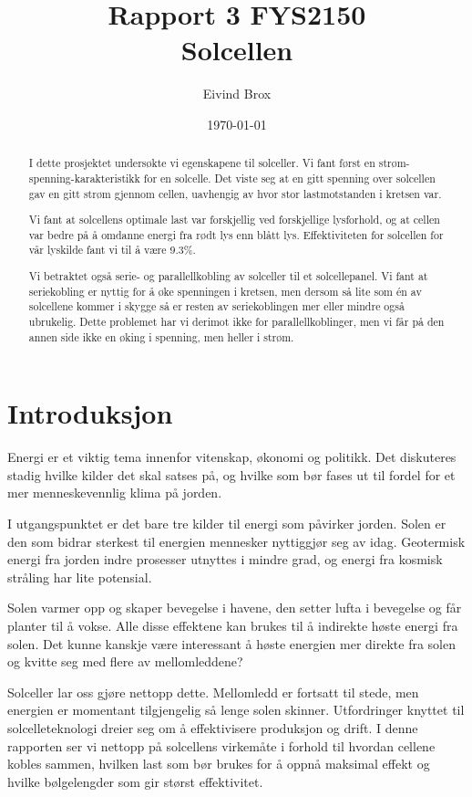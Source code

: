 \documentclass[a4paper,11pt, twocolumn]{article}
\title{Rapport 3 FYS2150\\Solcellen}
\author{Eivind Brox}
\date{\today}
\begin{document}
\maketitle
\begin{abstract}
I dette prosjektet undersøkte vi egenskapene til solceller. Vi fant først en strøm-spenning-karakteristikk for en solcelle. Det viste seg at en gitt spenning over solcellen gav en gitt strøm gjennom cellen, uavhengig av hvor stor lastmotstanden i kretsen var. 

Vi fant at solcellens optimale last var forskjellig ved forskjellige lysforhold, og at cellen var bedre på å omdanne energi fra rødt lys enn blått lys. Effektiviteten for solcellen for vår lyskilde fant vi til å være 9.3\%.

Vi betraktet også serie- og parallellkobling av solceller til et solcellepanel. Vi fant at seriekobling er nyttig for å øke spenningen i kretsen, men dersom så lite som \'en av solcellene kommer i skygge så er resten av seriekoblingen mer eller mindre også ubrukelig. Dette problemet har vi derimot ikke for parallellkoblinger, men vi får på den annen side ikke en øking i spenning, men heller i strøm.
\end{abstract}

\section{Introduksjon}
Energi er et viktig tema innenfor vitenskap, økonomi og politikk. Det diskuteres stadig hvilke kilder det skal satses på, og hvilke som bør fases ut til fordel for et mer menneskevennlig klima på jorden. 

I utgangspunktet er det bare tre kilder til energi som påvirker jorden. Solen er den som bidrar sterkest til energien mennesker nyttiggjør seg av idag. Geotermisk energi fra jorden indre prosesser utnyttes i mindre grad, og energi fra kosmisk stråling har lite potensial.

Solen varmer opp og skaper bevegelse i havene, den setter lufta i bevegelse og får planter til å vokse. Alle disse effektene kan brukes til å indirekte høste energi fra solen. Det kunne kanskje være interessant å høste energien mer direkte fra solen og kvitte seg med flere av mellomleddene?

Solceller lar oss gjøre nettopp dette. Mellomledd er fortsatt til stede, men energien er momentant tilgjengelig så lenge solen skinner. Utfordringer knyttet til solcelleteknologi dreier seg om å effektivisere produksjon og drift. I denne rapporten ser vi nettopp på solcellens virkemåte i forhold til hvordan cellene kobles sammen, hvilken last som bør brukes for å oppnå maksimal effekt og hvilke bølgelengder som gir størst effektivitet.   
\end{document}

